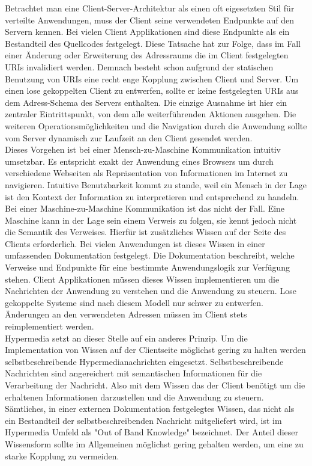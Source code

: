 Betrachtet man eine Client-Server-Architektur als einen oft eigesetzten Stil für verteilte Anwendungen, muss der Client seine verwendeten Endpunkte auf den Servern kennen. Bei vielen Client Applikationen sind diese Endpunkte als ein Bestandteil des Quellcodes festgelegt. Diese Tatsache hat zur Folge, dass im Fall einer Änderung oder Erweiterung des Adressraums die im Client festgelegten URIs invalidiert werden. Demnach besteht schon aufgrund der statischen Benutzung von URIs eine recht enge Kopplung zwischen Client und Server. Um einen lose gekoppelten Client zu entwerfen, sollte er keine festgelegten URIs aus dem Adress-Schema des Servers enthalten. Die einzige Ausnahme ist hier ein zentraler Eintrittspunkt, von dem alle weiterführenden Aktionen ausgehen. Die weiteren Operationsmöglichkeiten und die Navigation durch die Anwendung sollte vom Server dynamisch zur Laufzeit an den Client gesendet werden.\\
Dieses Vorgehen ist bei einer Mensch-zu-Maschine Kommunikation intuitiv umsetzbar. Es entspricht exakt der Anwendung eines Browsers um durch verschiedene Webseiten als Repräsentation von Informationen im Internet zu navigieren. Intuitive Benutzbarkeit kommt zu stande, weil ein Mensch in der Lage ist den Kontext der Information zu interpretieren und entsprechend zu handeln.\\
Bei einer Maschine-zu-Maschine Kommunikation ist das nicht der Fall. Eine Maschine kann in der Lage sein einem Verweis zu folgen, sie kennt jedoch nicht die Semantik des Verweises. Hierfür ist zusätzliches Wissen auf der Seite des Clients erforderlich. Bei vielen Anwendungen ist dieses Wissen in einer umfassenden Dokumentation festgelegt. Die Dokumentation beschreibt, welche Verweise und Endpunkte für eine bestimmte Anwendungslogik zur Verfügung stehen. Client Applikationen müssen dieses Wissen implementieren um die Nachrichten der Anwendung zu verstehen und die Anwendung zu steuern. Lose gekoppelte Systeme sind nach diesem Modell nur schwer zu entwerfen. Änderungen an den verwendeten Adressen müssen im Client stets reimplementiert werden.\\
Hypermedia setzt an dieser Stelle auf ein anderes Prinzip. Um die Implementation von Wissen auf der Clientseite möglichst gering zu halten werden selbstbeschreibende Hypermedianachrichten eingesetzt. Selbstbeschreibende Nachrichten sind angereichert mit semantischen Informationen für die Verarbeitung der Nachricht. Also mit dem Wissen das der Client benötigt um die erhaltenen Informationen darzustellen und die Anwendung zu steuern. Sämtliches, in einer externen Dokumentation festgelegtes Wissen, das nicht als ein Bestandteil der selbstbeschreibenden Nachricht mitgeliefert wird, ist im Hypermedia Umfeld als "Out of Band Knowledge" bezeichnet. Der Anteil dieser Wissensform sollte im Allgemeinen möglichst gering gehalten werden, um eine zu starke Kopplung zu vermeiden.\\
